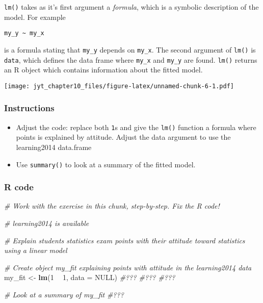 \documentclass[]{article}
\newenvironment{Shaded}{\begin{snugshade}}{\end{snugshade}}
\newcommand{\CommentTok}[1]{\textcolor[rgb]{0.56,0.35,0.01}{\textit{#1}}}
\newcommand{\DataTypeTok}[1]{\textcolor[rgb]{0.13,0.29,0.53}{#1}}
\newcommand{\DecValTok}[1]{\textcolor[rgb]{0.00,0.00,0.81}{#1}}
\newcommand{\KeywordTok}[1]{\textcolor[rgb]{0.13,0.29,0.53}{\textbf{#1}}}
\newcommand{\NormalTok}[1]{#1}
\newcommand{\OperatorTok}[1]{\textcolor[rgb]{0.81,0.36,0.00}{\textbf{#1}}}
\newcommand{\OtherTok}[1]{\textcolor[rgb]{0.56,0.35,0.01}{#1}}
\newcommand{\StringTok}[1]{\textcolor[rgb]{0.31,0.60,0.02}{#1}}
\providecommand{\tightlist}{%
  \setlength{\itemsep}{0pt}\setlength{\parskip}{0pt}}
\begin{document}
\texttt{lm()} takes as it's first argument a \emph{formula}, which is a
symbolic description of the model. For example

\texttt{my\_y\ \textasciitilde{}\ my\_x}

is a formula stating that \texttt{my\_y} depends on \texttt{my\_x}. The
second argument of \texttt{lm()} is \texttt{data}, which defines the
data frame where \texttt{my\_x} and \texttt{my\_y} are found.
\texttt{lm()} returns an R object which contains information about the
fitted model.

\texttt{[image: jyt\_chapter10\_files/figure-latex/unnamed-chunk-6-1.pdf]}

\hypertarget{instructions-3}{%
\subsubsection{Instructions}\label{instructions-3}}

\begin{itemize}
\tightlist
\item
  Adjust the code: replace both \texttt{1}s and give the \texttt{lm()}
  function a formula where points is explained by attitude. Adjust the
  data argument to use the learning2014 data.frame
\item
  Use \texttt{summary()} to look at a summary of the fitted model.
\end{itemize}

\hypertarget{r-code-3}{%
\subsubsection{R code}\label{r-code-3}}

\begin{Shaded}
\begin{Highlighting}[]
\CommentTok{# Work with the exercise in this chunk, step-by-step. Fix the R code!}

\CommentTok{# learning2014 is available}

\CommentTok{# Explain students statistics exam points with their attitude toward statistics using a linear model}

\CommentTok{# Create object my_fit explaining points with attitude in the learning2014 data}
\NormalTok{my_fit <-}\StringTok{ }\KeywordTok{lm}\NormalTok{(}\DecValTok{1} \OperatorTok{~}\StringTok{ }\DecValTok{1}\NormalTok{, }\DataTypeTok{data =} \OtherTok{NULL}\NormalTok{) }\CommentTok{#??? #??? #???}

\CommentTok{# Look at a summary of my_fit}
\CommentTok{#???}
\end{Highlighting}
\end{Shaded}
\end{document}
